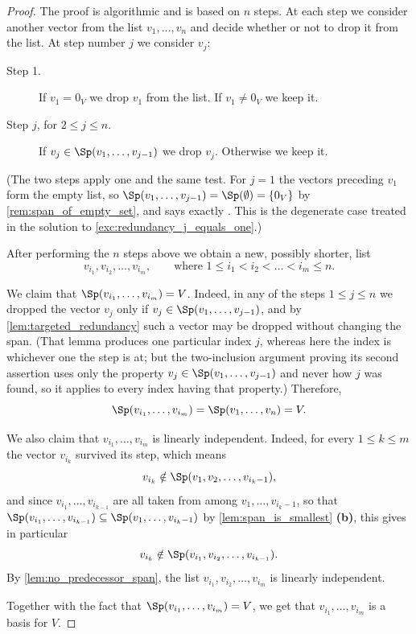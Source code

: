 \begin{proof}
The proof is algorithmic and is based on $n$ steps. At each step we consider another vector from the list $v_1, \dots, v_n$ and decide whether or not to drop it from the list. At step number $j$ we consider $v_j$:

\begin{description}
    \item[Step 1.] If $v_1 = 0_V$ we drop $v_1$ from the list. If $v_1 \ne 0_V$ we keep it.
    \item[Step $j$, for $2 \le j \le n$.] If $v_j \in \Sp(v_1, \dots, v_{j-1})$ we drop $v_j$. Otherwise we keep it.
\end{description}

(The two steps apply one and the same test. For $j = 1$ the vectors preceding $v_1$ form the empty list, so $\Sp(v_1, \dots, v_{j-1}) = \Sp(\emptyset) = \{0_V\}$ by \cref{rem:span_of_empty_set}, and  says exactly . This is the degenerate case treated in the solution to \cref{exc:redundancy_j_equals_one}.)

After performing the $n$ steps above we obtain a new, possibly shorter, list
\[
v_{i_1}, v_{i_2}, \dots, v_{i_m}, \qquad \text{where } 1 \le i_1 < i_2 < \dots < i_m \le n.
\]

We claim that $\Sp(v_{i_1}, \dots, v_{i_m}) = V$. Indeed, in any of the steps $1 \le j \le n$ we dropped the vector $v_j$ only if $v_j \in \Sp(v_1, \dots, v_{j-1})$, and by \cref{lem:targeted_redundancy} such a vector may be dropped without changing the span. (That lemma produces one particular index $j$, whereas here the index is whichever one the step is at; but the two-inclusion argument proving its second assertion uses only the property $v_j \in \Sp(v_1, \dots, v_{j-1})$ and never how $j$ was found, so it applies to every index having that property.) Therefore,
\[
\Sp(v_{i_1}, \dots, v_{i_m}) = \Sp(v_1, \dots, v_n) = V.
\]

We also claim that $v_{i_1}, \dots, v_{i_m}$ is linearly independent. Indeed, for every $1 \le k \le m$ the vector $v_{i_k}$ survived its step, which means
\[
v_{i_k} \notin \Sp(v_1, v_2, \dots, v_{i_k - 1}),
\]
and since $v_{i_1}, \dots, v_{i_{k-1}}$ are all taken from among $v_1, \dots, v_{i_k - 1}$, so that $\Sp(v_{i_1}, \dots, v_{i_{k-1}}) \subseteq \Sp(v_1, \dots, v_{i_k - 1})$ by \cref{lem:span_is_smallest} \textbf{(b)}, this gives in particular
\[
v_{i_k} \notin \Sp(v_{i_1}, v_{i_2}, \dots, v_{i_{k-1}}).
\]
By \cref{lem:no_predecessor_span}, the list $v_{i_1}, v_{i_2}, \dots, v_{i_m}$ is linearly independent.

Together with the fact that $\Sp(v_{i_1}, \dots, v_{i_m}) = V$, we get that $v_{i_1}, \dots, v_{i_m}$ is a basis for $V$.
\end{proof}

